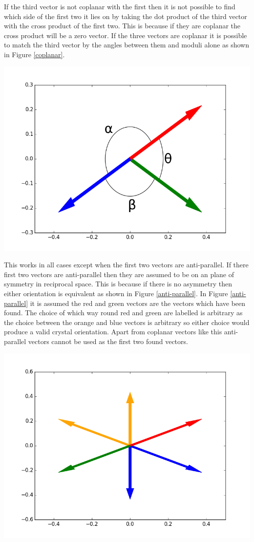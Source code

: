 \documentclass[10pt,a4paper]{article}
\begin{document}
\begin{multicols}{2}
If the third vector is not coplanar with the first then it is not possible to find which side of the first two it lies on by taking the dot product of the third vector with the cross product of the first two. This is because if they are coplanar the cross product will be a zero vector. If the three vectors are coplanar it is possible to match the third vector by the angles between them and moduli alone as shown in Figure \ref{coplanar}. 
\begin{center}
\includegraphics [width=5 cm]{angles.png}
\label{coplanar}
\end{center}
This works in all cases except when the first two vectors are anti-parallel. If there first two vectors are anti-parallel then they are assumed to be on an plane of symmetry in reciprocal space. This is because if there is no asymmetry then either orientation is equivalent as shown in Figure \ref{anti-parallel}. In Figure \ref{anti-parallel} it is assumed the red and green vectors are the vectors which have been found. The choice of which way round red and green are labelled is arbitrary as the choice between the orange and blue vectors is arbitrary so either choice would produce a valid crystal orientation. Apart from coplanar vectors like this anti-parallel vectors cannot be used as the first two found vectors.
\begin{center}
\includegraphics [width=5 cm]{coplanar.png}
\label{anti-parallel}
\end{center}


\end{multicols}
\end{document}
